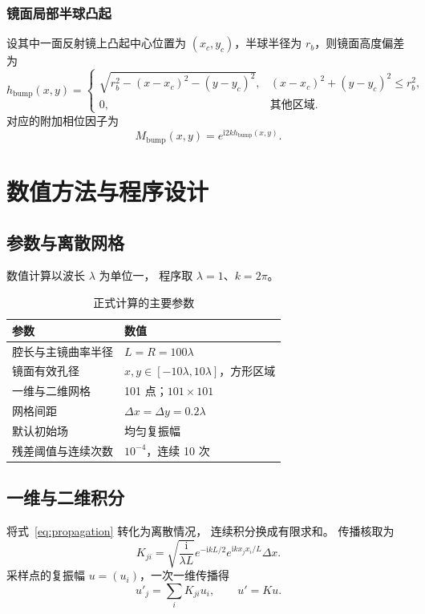 \documentclass[UTF8,a4paper,12pt]{ctexart}
\begin{document}
\subsubsection{镜面局部半球凸起}
设其中一面反射镜上凸起中心位置为 \((x_c,y_c)\)，半球半径为 \(r_b\)，则镜面高度偏差为
\begin{equation}\label{eq:hemisphere}
 h_{\mathrm{bump}}(x,y)=
 \begin{cases}
 \sqrt{r_b^2-(x-x_c)^2-(y-y_c)^2},&(x-x_c)^2+(y-y_c)^2\le r_b^2,\\
 0,&\text{其他区域}.
 \end{cases}
\end{equation}
对应的附加相位因子为
\begin{equation}
 M_{\mathrm{bump}}(x,y)=e^{\mathrm{i}2kh_{\mathrm{bump}}(x,y)}.
\end{equation}

\section{数值方法与程序设计}

\subsection{参数与离散网格}
数值计算以波长 \(\lambda\) 为单位一，
程序取 \(\lambda=1\)、\(k=2\pi\)。
\begin{table}[!htbp]
 \centering
 \caption{正式计算的主要参数}\label{tab:parameters}
 \begin{tabular}{ll}\toprule
 参数 & 数值\\\midrule
 腔长与主镜曲率半径 & \(L=R=100\lambda\)\\
 镜面有效孔径 & \(x,y\in[-10\lambda,10\lambda]\)，方形区域\\
 一维与二维网格 & 101 点；\(101\times101\)\\
 网格间距 & \(\Delta x=\Delta y=0.2\lambda\)\\
 默认初始场 & 均匀复振幅\\
 残差阈值与连续次数 & \(10^{-4}\)，连续 10 次\\
 \bottomrule\end{tabular}
\end{table}

\subsection{一维与二维积分}
将式~\eqref{eq:propagation} 转化为离散情况，
连续积分换成有限求和。
传播核取为
\begin{equation}\label{eq:kernel-1d}
 K_{ji}=\sqrt{\frac{\mathrm{i}}{\lambda L}}e^{-\mathrm{i}kL/2}
 e^{\mathrm{i}kx_jx_i/L}\Delta x.
\end{equation}
采样点的复振幅 \(u=(u_i)\)，一次一维传播得
\begin{equation}\label{eq:propagation-1d}
 u'_j=\sum_iK_{ji}u_i,\qquad u'=Ku.
\end{equation}
\end{document}
